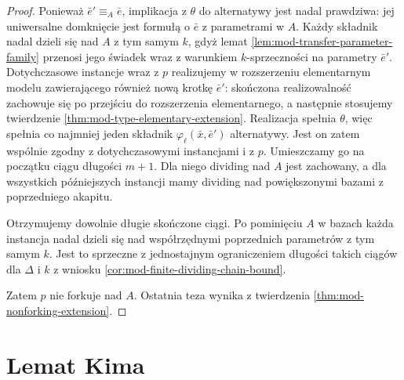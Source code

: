 \begin{proof}
Ponieważ $\bar e'\equiv_A\bar e$,
implikacja z $\theta$ do alternatywy
jest nadal prawdziwa: jej uniwersalne domknięcie
jest formułą o $\bar e$ z parametrami w $A$.
Każdy składnik nadal dzieli się nad $A$
z tym samym $k$, gdyż lemat
\ref{lem:mod-transfer-parameter-family}
przenosi jego świadek wraz z warunkiem
$k$-sprzeczności na parametry $\bar e'$.
Dotychczasowe instancje wraz z $p$ realizujemy
w rozszerzeniu elementarnym modelu zawierającego
również nową krotkę $\bar e'$: skończona
realizowalność zachowuje się po przejściu
do rozszerzenia elementarnego, a następnie
stosujemy twierdzenie
\ref{thm:mod-type-elementary-extension}.
Realizacja spełnia $\theta$, więc spełnia
co najmniej jeden składnik
$\varphi_\ell(\bar x,\bar e')$ alternatywy.
Jest on zatem wspólnie zgodny z dotychczasowymi
instancjami i z $p$.
Umieszczamy go na początku ciągu
długości $m+1$.
Dla niego dividing nad $A$ jest zachowany,
a dla wszystkich późniejszych instancji
mamy dividing nad powiększonymi bazami
z poprzedniego akapitu.

Otrzymujemy dowolnie długie skończone ciągi.
Po pominięciu $A$ w bazach każda instancja
nadal dzieli się nad współrzędnymi poprzednich
parametrów z tym samym $k$.
Jest to sprzeczne z jednostajnym ograniczeniem
długości takich ciągów dla $\Delta$ i $k$
z wniosku \ref{cor:mod-finite-dividing-chain-bound}.

Zatem $p$ nie forkuje nad $A$.
Ostatnia teza wynika z twierdzenia
\ref{thm:mod-nonforking-extension}.
\end{proof}

\section{Lemat Kima}

